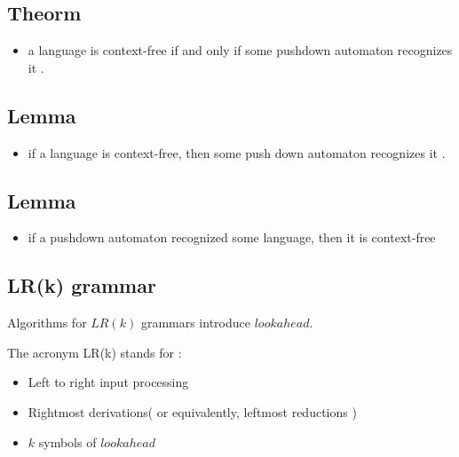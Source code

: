 \documentclass[12pt]{article}
\begin{document}
\subsection{Theorm}

\begin{tcolorbox}
\begin{itemize}
	\item a language is context-free if and only if some pushdown automaton recognizes it .
\end{itemize}
\end{tcolorbox}



\subsection{Lemma}


\begin{tcolorbox}
\begin{itemize}
	\item if a language is context-free, then some push down automaton recognizes it .
\end{itemize}
\end{tcolorbox}



\subsection{Lemma}

\begin{tcolorbox}
\begin{itemize}
	\item if a pushdown automaton recognized some language, then it is context-free
\end{itemize}
\end{tcolorbox}


\newpage

\subsection{LR(k) grammar}

Algorithms for $LR(k)$ grammars introduce $lookahead$.

\noindent
The acronym LR(k) stands for : 
\begin{itemize}
	\item Left to right input processing
	\item Rightmost derivations( or equivalently, leftmost reductions )
	\item $k$ symbols of $lookahead$	
\end{itemize}
\end{document}
